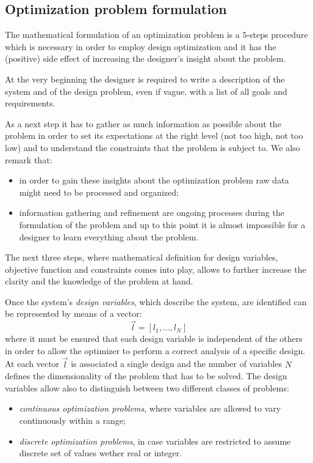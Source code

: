 
\subsection{Optimization problem formulation}

The mathematical formulation of an optimization problem is a $5$-steps procedure which is necessary in order to employ design optimization and it has the (positive) side effect of increasing the designer's insight about the problem.

At the very beginning the designer is required to write a description of the system and of the design problem, even if vague, with a list of all goals and requirements.

As a next step it has to gather as much information as possible about the problem in order to set its expectations at the right level (not too high, not too low) and to understand the constraints that the problem is subject to.
We also remark that:
\begin{itemize}
	\item in order to gain these insights about the optimization problem raw data might need to be processed and organized;
	\item information gathering and refinement are ongoing processes during the formulation of the problem and up to this point it is almost impossible for a designer to learn everything about the problem.
\end{itemize}
The next three steps, where mathematical definition for design variables, objective function and constraints comes into play, allows to further increase the clarity and the knowledge of the problem at hand.

\smallskip
Once the system's \emph{design variables}, which describe the system, are identified can be represented by means of a vector:
\begin{equation}
	\vec{l} = [l_1, \dots, l_N]
\end{equation}
where it must be ensured that each design variable is independent of the others in order to allow the optimizer to perform a correct analysis of a specific design.
At each vector $\vec{l}$ is associated a single design and the number of variables $N$ defines the dimensionality of the problem that has to be solved. The design variables allow also to distinguish between two different classes of problems:
\begin{itemize}
	\item \emph{continuous optimization problems}, where variables are allowed to vary continuously within a range;
	\item \emph{discrete optimization problems}, in case variables are restricted to assume discrete set of values wether real or integer.
\end{itemize}

